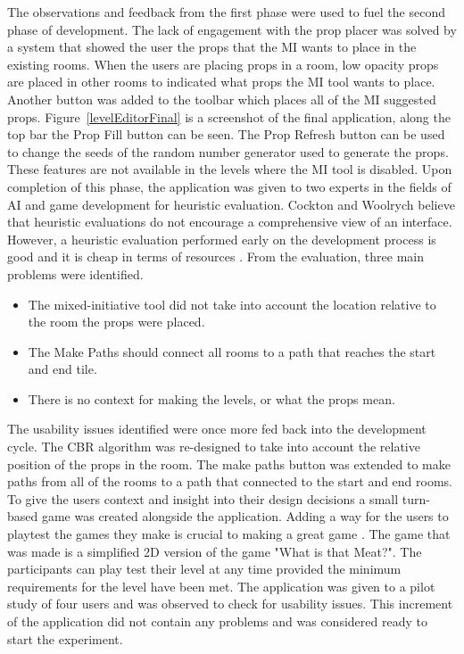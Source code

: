 \documentclass[journal]{IEEEtran}
\begin{document}
The observations and feedback from the first phase were used to fuel the second phase of development. The lack of engagement with the prop placer was solved by a system that showed the user the props that the MI wants to place in the existing rooms. When the users are placing props in a room, low opacity props are placed in other rooms to indicated what props the MI tool wants to place. Another button was added to the toolbar which places all of the MI suggested props. Figure~\ref{levelEditorFinal} is a screenshot of the final application, along the top bar the Prop Fill button can be seen. The Prop Refresh button can be used to change the seeds of the random number generator used to generate the props. These features are not available in the levels where the MI tool is disabled. Upon completion of this phase, the application was given to two experts in the fields of AI and game development for heuristic evaluation.  Cockton and Woolrych\cite{cockton2002sale} believe that heuristic evaluations do not encourage a comprehensive view of an interface. However, a heuristic evaluation performed early on the development process is good \cite{nielsen1990heuristic} and it is cheap in terms of resources \cite{nielsen1990heuristic}. From the evaluation, three main problems were identified.
\begin{itemize}
\item The mixed-initiative tool did not take into account the location relative to the room the props were placed.
\item The Make Paths should connect all rooms to a path that reaches the start and end tile.
\item There is no context for making the levels, or what the props mean.
\end{itemize}

The usability issues identified were once more fed back into the development cycle. The CBR algorithm was re-designed to take into account the relative position of the props in the room. The make paths button was extended to make paths from all of the rooms to a path that connected to the start and end rooms. To give the users context and insight into their design decisions a small turn-based game was created alongside the application. Adding a way for the users to playtest the games they make is crucial to making a great game \cite{winn2006resolving}. The game that was made is a simplified  2D version of the game "What is that Meat?". The participants can play test their level at any time provided the minimum requirements for the level have been met. The application was given to a pilot study of four users and was observed to check for usability issues. This increment of the application did not contain any problems and was considered ready to start the experiment.
\end{document}
